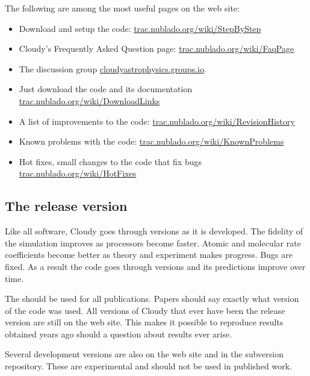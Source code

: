 \documentclass[12pt,twoside]{article}
\begin{document}
The following are among the most useful pages on the web site:
\begin{itemize}

\item Download and setup the code:
\href{http://trac.nublado.org/wiki/StepByStep}{trac.nublado.org/wiki/StepByStep}

\item Cloudy's Frequently Asked Question page:
\href{http://trac.nublado.org/wiki/FaqPage}{trac.nublado.org/wiki/FaqPage}

\item The discussion group
\href{https://cloudyastrophysics.groups.io}{cloudyastrophysics.groups.io}.
\item Just download the code and its documentation
\href{http://trac.nublado.org/wiki/DownloadLinks}{trac.nublado.org/wiki/DownloadLinks}

\item A list of improvements to the code:
\href{http://trac.nublado.org/wiki/RevisionHistory}{trac.nublado.org/wiki/RevisionHistory}

\item Known problems with the code:
\href{http://trac.nublado.org/wiki/KnownProblems}{trac.nublado.org/wiki/KnownProblems}

\item Hot fixes, small changes to the code that fix bugs
\href{http://trac.nublado.org/wiki/HotFixes}{trac.nublado.org/wiki/HotFixes}
\end{itemize}

\subsection{The release version}

Like all software, Cloudy goes through versions as it is developed.
The fidelity of the simulation improves as processors become faster.  Atomic
and molecular rate coefficients become better as theory and experiment makes
progress.  Bugs are fixed.
As a result the code goes through versions and its predictions improve over time.

The  should
be used for all publications.  Papers
should say exactly what version of the code was used.
All versions of Cloudy
that ever have been the release version are still on the web site.
This makes it possible to reproduce results obtained years ago should a
question about results ever arise.

Several development versions are also on the web site and in the
subversion repository.  These are experimental and should not be used in
published work.
\end{document}
